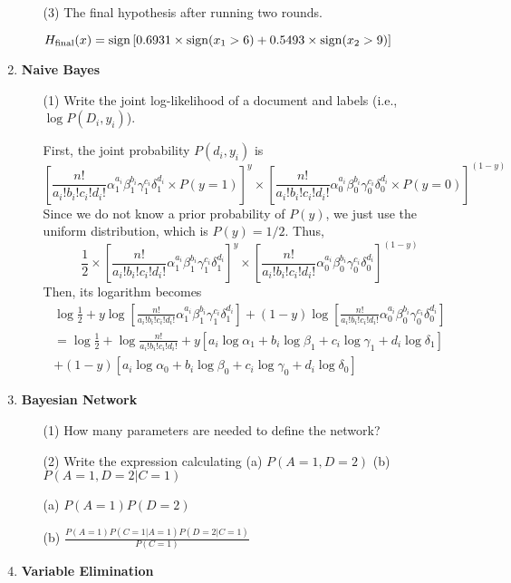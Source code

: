 \begin{enumerate}
\begin{enumerate}
\item[(3)] The final hypothesis after running two rounds.

$H_{\rm final}(x)={\rm sign} \left[ 0.6931 \times {\rm sign}(x_1 > 6) + 0.5493 \times {\rm sign}(x_2 > 9) \right]$

\end{enumerate}

\item {\bf Naive Bayes}

\begin{enumerate}
\item[(1)] Write the joint log-likelihood of a document and labels (i.e., $\log P(D_i, y_i)$).

First, the joint probability $P(d_i, y_i)$ is
\[
\left[ \frac{n!}{a_i!b_i!c_i!d_i!}\alpha_1^{a_i}\beta_1^{b_i}\gamma_1^{c_i}\delta_1^{d_i} \times P(y=1)\right]^y \times \left[ \frac{n!}{a_i!b_i!c_i!d_i!}\alpha_0^{a_i}\beta_0^{b_i}\gamma_0^{c_i}\delta_0^{d_i} \times P(y=0)\right]^{(1-y)}
\]
Since we do not know a prior probability of $P(y)$, we just use the uniform distribution, which is $P(y)=1/2$. Thus,
\[
\frac{1}{2} \times \left[ \frac{n!}{a_i!b_i!c_i!d_i!}\alpha_1^{a_i}\beta_1^{b_i}\gamma_1^{c_i}\delta_1^{d_i}\right]^y \times \left[ \frac{n!}{a_i!b_i!c_i!d_i!}\alpha_0^{a_i}\beta_0^{b_i}\gamma_0^{c_i}\delta_0^{d_i}\right]^{(1-y)}
\]
Then, its logarithm becomes
\begin{eqnarray}
\log \frac{1}{2} + y \log \left[ \frac{n!}{a_i!b_i!c_i!d_i!}\alpha_1^{a_i}\beta_1^{b_i}\gamma_1^{c_i}\delta_1^{d_i}\right] + (1-y) \log \left[ \frac{n!}{a_i!b_i!c_i!d_i!}\alpha_0^{a_i}\beta_0^{b_i}\gamma_0^{c_i}\delta_0^{d_i}\right]
 \nonumber \\
= \log \frac{1}{2} + \log \frac{n!}{a_i!b_i!c_i!d_i!} + y \left[ a_i \log \alpha_1 + b_i \log \beta_1 + c_i \log \gamma_1 + d_i \log \delta_1 \right] \nonumber \\ + (1-y) \left[ a_i \log \alpha_0 + b_i \log \beta_0 + c_i \log \gamma_0 + d_i \log \delta_0 \right] \nonumber
\end{eqnarray}

\end{enumerate}

\item {\bf Bayesian Network}
\begin{enumerate}

\item[(1)] How many parameters are needed to define the network?

\item[(2)] Write the expression calculating (a) $P(A=1, D=2)$ (b) $P(A=1,D=2|C=1)$

(a) $P(A=1)P(D=2)$

(b) $\frac{P(A=1)P(C=1|A=1)P(D=2|C=1)}{P(C=1)}$

\end{enumerate}

\item {\bf Variable Elimination}

\end{enumerate}




